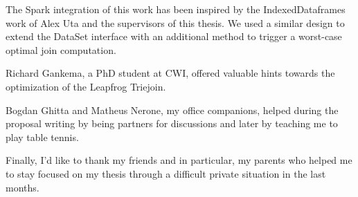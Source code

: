 \documentclass[11pt]{article}
\begin{document}
The Spark integration of this work has been inspired by the IndexedDataframes~\cite{uta2019low} work of Alex Uta and the supervisors
of this thesis.
We used a similar design to extend the DataSet interface with an additional method to trigger a worst-case optimal join computation.

Richard Gankema, a PhD student at CWI, offered valuable hints towards the optimization of the Leapfrog Triejoin.

Bogdan Ghitta and Matheus Nerone, my office companions, helped during the proposal writing by being partners for discussions and later
by teaching me to play table tennis.

Finally, I'd like to thank my friends and in particular, my parents who helped me to stay focused on my thesis through a difficult private
situation in the last months.

\newpage
\tableofcontents
\newpage










\clearpage

\printbibliography
\clearpage


\end{document}
